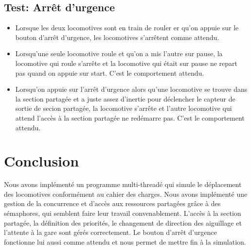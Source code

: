 \documentclass{article}
\begin{document}
\subsection*{Test: Arrêt d'urgence}

\begin{itemize}

\item Lorsque les deux locomotives sont en train de rouler er qu'on appuie sur le bouton d'arrêt d'urgence, les locomotives s'arrêtent comme attendu.

\item Lorsqu'une seule locomotive roule et qu'on a mis l'autre sur pause, la locomotive qui roule s'arrête et la locomotive qui était sur pause ne
repart pas quand on appuie sur start. C'est le comportement attendu.

\item Lorsqu'on appuie sur l'arrêt d'urgence alors qu'une locomotive se trouve dans la section partagée et a juste assez d'inertie pour déclencher
le capteur de sortie de secion partagée, la locomotive s'arrête et l'autre locomotive qui attend l'accès à la section partagée ne redémarre pas. 
C'est le comportement attendu.

\end{itemize}

\section*{Conclusion}
Nous avons implémenté un programme multi-threadé qui simule le déplacement des locomotives conformément au cahier des charges. Nous avons implémenté une 
gestion de la concurrence et d'accès aux ressources partagées grâce à des sémaphores, qui semblent faire leur travail convenablement. L'accès à la section 
partagée, la définition des priorités, le changement de direction des aiguillage et l'attente à la gare sont gérés correctement. Le bouton d'arrêt d'urgence 
fonctionne lui aussi comme attendu et nous permet de mettre fin à la simulation.
\end{document}
